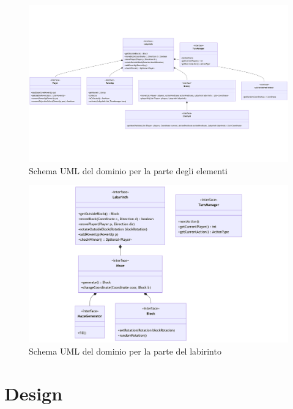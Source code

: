 \documentclass[a4paper,12pt]{report}
\begin{document}
\begin{figure}[H]
	\centering{}
	\includegraphics[width=14cm]{img/DominioElementi.png}
	\caption{Schema UML del dominio per la parte degli elementi}
	\label{img:dominio elementi}
\end{figure}

\begin{figure}[H]
	\centering{}
	\includegraphics[width=14cm]{img/DominioLabirinto.png}
	\caption{Schema UML del dominio per la parte del labirinto}
	\label{img:dominio labirinto}
\end{figure}

\chapter{Design}
\end{document}
